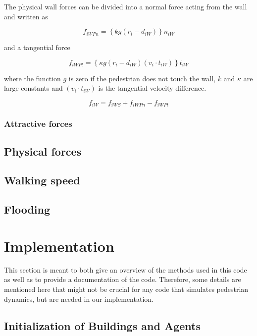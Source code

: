 \documentclass[11pt]{article}
\begin{document}
The physical wall forces can be divided into a normal force acting from the wall and written as

\begin{equation}
	{f_{iWPn}} = \left\{ {kg\left( {{r_i} - {d_{iW}}} \right)} \right\}{n_{iW}}
	\label{eq:fiWPn}
\end{equation}

and a tangential force

\begin{equation}
	{f_{iWPt}} = \left\{ {\kappa g\left( {{r_i} - {d_{iW}}} \right)\left( {{v_i} \cdot {t_{iW}}} \right)} \right\}{t_{iW}}
	\label{eq:fiWPt}
\end{equation}

where the function $g$ is zero if the pedestrian does not touch the wall, $k$ and $\kappa$ are large constants and $(v_i \cdot t_{iW})$ is the tangential velocity difference.

\begin{equation}
	{f_{iW}} = {f_{iWS}} + {f_{iWPn}} - {f_{iWPt}}
	\label{eq:fiW}
\end{equation}



\subsubsection{Attractive forces}
\subsection{Physical forces}
\subsection{Walking speed}
\subsection{Flooding}

\section{Implementation}
This section is meant to both give an overview of the methods used in this code as well as to provide a documentation of the code. Therefore, some details are mentioned here that might not be crucial for any code that simulates pedestrian dynamics, but are needed in our implementation. 
\subsection{Initialization of Buildings and Agents}
\end{document}
